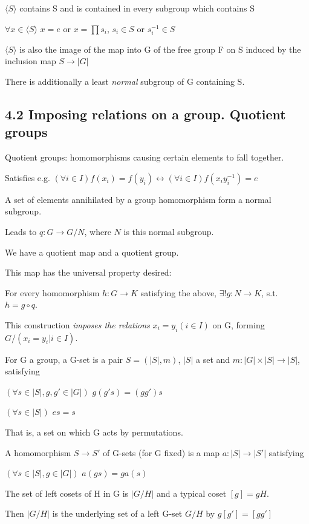 \documentclass[12pt]{article}
\begin{document}
$\langle S \rangle$ contains S and is contained in every subgroup which contains S

$\forall x \in \langle S \rangle$ $x = e$ or $x = \prod s_i$, $s_i \in S$ or $s_i^{-1} \in S$

$\langle S \rangle$ is also the image of the map into G of the free group F on S induced by the inclusion map $S \to |G|$

There is additionally a least \textit{normal} subgroup of G containing S.

\subsection{4.2 Imposing relations on a group. Quotient groups}

Quotient groups: homomorphisms causing certain elements to fall together.

Satisfies e.g. $(\forall i \in I) f(x_i) = f(y_i) \leftrightarrow (\forall i \in I) f(x_iy_i^{-1}) = e$

A set of elements annihilated by a group homomorphism form a normal subgroup.

Leads to $q: G \to G\slash N$, where $N$ is this normal subgroup.

We have a quotient map and a quotient group.

\noindent
This map has the universal property desired:

For every homomorphism $h: G \to K$ satisfying the above, $\exists ! g : N \to K$, s.t. $h = g \circ q$.

\noindent
This construction \textit{imposes the relations} $x_i = y_i (i \in I)$ on G, forming $G \slash (x_i = y_i | i \in I)$.

\noindent
For G a group, a G-set is a pair $S = (|S|, m)$, $|S|$ a set and $m: |G| \times |S| \to |S|$, satisfying

$(\forall s \in |S|, g, g' \in |G|)$ $g(g's) = (gg')s$

$(\forall s \in |S|)$ $es = s$

That is, a set on which G acts by permutations.

\noindent
A homomorphism $S \to S'$ of G-sets (for G fixed) is a map $a: |S| \to |S'|$ satisfying

$(\forall s \in |S|, g \in |G|)$ $a(gs) = g a (s)$

\noindent
The set of left cosets of H in G is $|G \slash H|$ and a typical coset $[g] = gH$.

Then $|G\slash H|$ is the underlying set of a left G-set $G\slash H$ by $g[g'] = [gg']$
\end{document}
